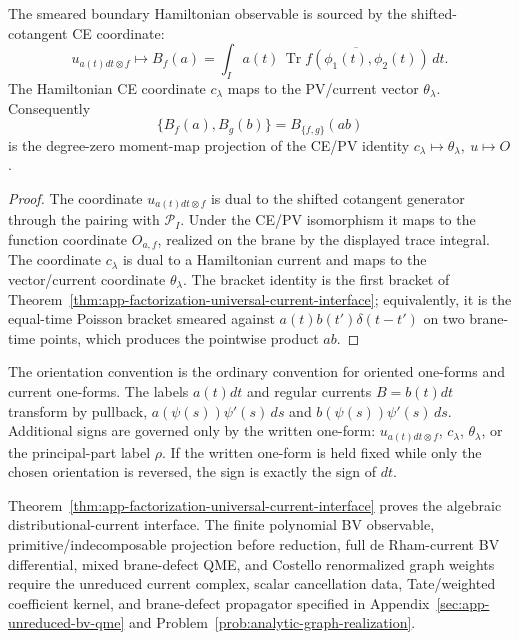 \begin{cor}
\label{cor:app-factorization-source-of-B}
\label{prop:app-factorization-source-of-B}
  The smeared boundary Hamiltonian observable is sourced by the
  shifted-cotangent CE coordinate:
  \[
    u_{a(t)dt\otimes f}\longmapsto
    B_f(a)
      =\int_I a(t)\,
        \overline{\operatorname{Tr}
        f(\phi_1(t),\phi_2(t))}\,dt .
  \]
  The Hamiltonian CE coordinate \(c_\lambda\) maps to the PV/current
  vector \(\theta_\lambda\).  Consequently
  \[
    \{B_f(a),B_g(b)\}=B_{\{f,g\}}(ab)
  \]
  is the degree-zero moment-map projection of the CE/PV identity
  \(c_\lambda\mapsto\theta_\lambda,\ u\mapsto O\).
\end{cor}

\begin{proof}
  The coordinate \(u_{a(t)dt\otimes f}\) is dual to the shifted
  cotangent generator through the pairing with
  \(\mathcal P_I\).  Under the CE/PV isomorphism it maps to the
  function coordinate \(O_{a,f}\), realized on the brane by the
  displayed trace integral.  The coordinate \(c_\lambda\) is dual to a
  Hamiltonian current and maps to the vector/current coordinate
  \(\theta_\lambda\).  The bracket identity is the first bracket of
  Theorem~\ref{thm:app-factorization-universal-current-interface};
  equivalently, it is the equal-time Poisson bracket smeared against
  \(a(t)b(t')\delta(t-t')\) on two brane-time points, which produces
  the pointwise product \(ab\).
\end{proof}

\begin{rmk}
\label{rmk:app-factorization-orientation-reversal}
  The orientation convention is the ordinary convention for oriented
  one-forms and current one-forms.  The labels \(a(t)dt\) and regular
  currents \(B=b(t)dt\) transform by pullback,
  \(a(\psi(s))\psi'(s)\,ds\) and \(b(\psi(s))\psi'(s)\,ds\).  Additional
  signs are governed only by the written one-form:
  \(u_{a(t)dt\otimes f}\), \(c_\lambda\), \(\theta_\lambda\), or the
  principal-part label \(\rho\).  If the written one-form is held fixed
  while only the chosen orientation is reversed, the sign is exactly the
  sign of \(dt\).
\end{rmk}

\begin{rmk}
\label{rmk:app-factorization-residual}
  Theorem~\ref{thm:app-factorization-universal-current-interface}
  proves the algebraic distributional-current interface.  The finite
  polynomial BV observable, primitive/indecomposable projection before
  reduction, full de Rham-current BV differential, mixed brane-defect QME,
  and Costello renormalized graph weights require the unreduced current
  complex, scalar cancellation data, Tate/weighted coefficient kernel,
  and brane-defect propagator specified in
  Appendix~\ref{sec:app-unreduced-bv-qme} and
  Problem~\ref{prob:analytic-graph-realization}.
\end{rmk}

